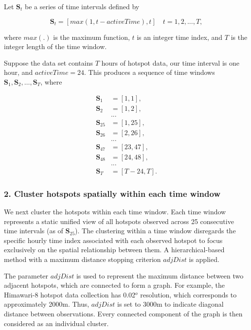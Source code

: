 Let \(\boldsymbol{S}_t\) be a series of time intervals defined by

\[\boldsymbol{S}_t = [max(1,t-activeTime),t]\quad t = 1,2,...,T,\]

\noindent where \(max(.)\) is the maximum function, \(t\) is an integer time index, and \(T\) is the integer length of the time window.

Suppose the data set contains \(T\) hours of hotspot data, our time interval is one hour, and \(activeTime = 24\). This produces a sequence of time windows
\(\boldsymbol{S}_1,\boldsymbol{S}_2,\ldots,\boldsymbol{S}_{T}\), where

\begin{align*}
\boldsymbol{S}_1 &= [1,1],\\
\boldsymbol{S}_2 &= [1,2],\\
&...\\
\boldsymbol{S}_{25} &= [1,25],\\
\boldsymbol{S}_{26} &= [2,26],\\
&...\\
\boldsymbol{S}_{47} &= [23,47],\\
\boldsymbol{S}_{48} &= [24,48],\\
&...\\
\boldsymbol{S}_{T} &= [T-24,T].
\end{align*}

\hypertarget{cluster-hotspots-spatially-within-each-time-window}{%
\subsubsection{2. Cluster hotspots spatially within each time window}\label{cluster-hotspots-spatially-within-each-time-window}}

We next cluster the hotspots within each time window. Each time window represents a static unified view of all hotspots observed across 25 consecutive time intervals (as of \(\boldsymbol{S}_{25}\)). The clustering within a time window disregards the specific hourly time index associated with each observed hotspot to focus exclusively on the spatial relationship between them. A hierarchical-based method with a maximum distance stopping criterion \(adjDist\) is applied.

The parameter \(adjDist\) is used to represent the maximum distance between two adjacent hotspots, which are connected to form a graph. For example, the Himawari-8 hotspot data collection has 0.02\(^o\) resolution, which corresponds to approximately 2000m. Thus, \(adjDist\) is set to 3000m to indicate diagonal distance between observations. Every connected component of the graph is then considered as an individual cluster.

